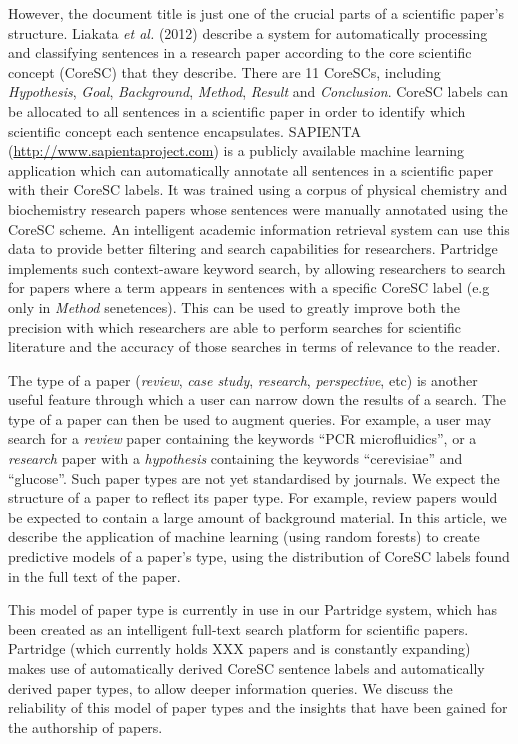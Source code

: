 \documentclass{svmult}
\begin{document}
However, the document title is just one of the crucial parts of a scientific
paper's structure.  Liakata \emph{et al.} (2012) describe a system for
automatically processing and classifying sentences in a research paper
according to the core scientific concept (CoreSC) that they
describe\cite{Liakata2012}.  There are 11 CoreSCs, including {\em Hypothesis},
{\em Goal}, {\it Background}, {\em Method}, {\em Result} and {\em Conclusion}.
CoreSC labels can be allocated to all sentences in a scientific paper in order
to identify which scientific concept each sentence encapsulates.  SAPIENTA
(\url{http://www.sapientaproject.com}) is a publicly available machine learning
application which can automatically annotate all sentences in a scientific
paper with their CoreSC labels. It was trained using a corpus of physical
chemistry and biochemistry research papers whose sentences were manually
annotated using the CoreSC\cite{LIAKATA10.644} scheme.  An intelligent academic
information retrieval system can use this data to provide better filtering and
search capabilities for researchers.  Partridge implements such context-aware
keyword search, by allowing researchers to search for papers where a term
appears in sentences with a specific CoreSC label (e.g only in {\em Method}
senetences). This can be used to greatly improve both the precision with which
researchers are able to perform searches for scientific literature and the
accuracy of those searches in terms of relevance to the reader.

The type of a paper ({\em review}, {\em case study}, {\em research}, {\em
perspective}, etc) is another useful feature through which a user can narrow
down the results of a search.  The type of a paper can then be used to augment
queries.  For example, a user may search for a {\em review} paper containing
the keywords ``PCR microfluidics'', or a {\em research} paper with a {\em
hypothesis} containing the keywords ``cerevisiae'' and ``glucose''.   Such
paper types are not yet standardised by journals.  We expect the structure of a
paper to reflect its paper type.  For example, review papers would be expected
to contain a large amount of background material.  In this article, we describe
the application of machine learning (using random forests) to create predictive
models of a paper's type, using the distribution of CoreSC labels found in the
full text of the paper. 

This model of paper type is currently in use in our Partridge system, which has
been created as an intelligent full-text search platform for scientific papers.
Partridge (which currently holds XXX papers and is constantly expanding) 
makes use of automatically derived CoreSC sentence labels and
automatically derived paper types, to allow deeper information queries.  We
discuss the reliability of this model of paper types and the insights that have
been gained for the authorship of papers.
\end{document}
